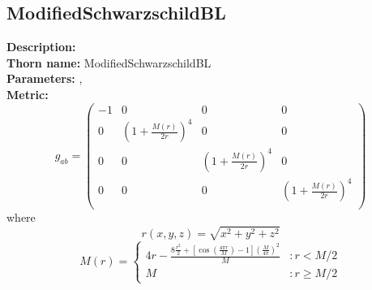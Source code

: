 \subsection{ModifiedSchwarzschildBL}
{\bf Description:}   \\
{\bf Thorn name:} ModifiedSchwarzschildBL \\
{\bf Parameters:} ,  \\
{\bf Metric:} \\
\begin{equation}
g_{ab} = 
\left(
\begin{array}{cccc}
 -1 & 0 & 0 & 0 \\
 0 & \left(1+\frac{M(r)}{2 r}\right)^4 & 0 & 0 \\
 0 & 0 & \left(1+\frac{M(r)}{2 r}\right)^4 & 0 \\
 0 & 0 & 0 & \left(1+\frac{M(r)}{2 r}\right)^4 \\
\end{array}
\right)
\end{equation}
where
\begin{equation}
r(x,y,z)=\sqrt{x^2+y^2+z^2}
\end{equation}
\begin{equation}
M(r) = \left\{
     \begin{array}{lr}
       4 r - \frac{8 \frac{r^2}{2} + [\cos(\frac{4 \pi r}{M}) - 1] \left(\frac{M}{4 \pi}\right)^2}{M} & : r < M/2\\
       M & : r \ge M/2
     \end{array}
   \right.
\end{equation}